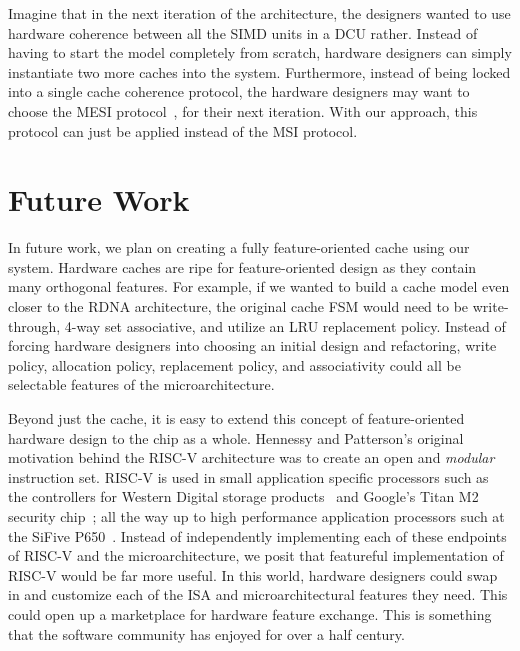 \documentclass[sigplan,anonymous, review]{acmart}
\begin{document}
Imagine that in the next iteration of the architecture, the designers wanted to use hardware coherence between all the SIMD units in a DCU rather. Instead of having to start the model completely from scratch, hardware designers can simply instantiate two more caches into the system. Furthermore, instead of being locked into a single cache coherence protocol, the hardware designers may want to choose the MESI protocol~\cite{Papamarcos:84}, for their next iteration. With our approach, this protocol can just be applied instead of the MSI protocol. 

\section{Future Work}
In future work, we plan on creating a fully feature-oriented cache using our system. Hardware caches are ripe for feature-oriented design as they contain many orthogonal features. For example, if we wanted to build a cache model even closer to the RDNA architecture, the original cache FSM would need to be write-through, 4-way set associative, and utilize an LRU replacement policy. Instead of forcing hardware designers into choosing an initial design and refactoring, write policy, allocation policy, replacement policy, and associativity could all be selectable features of the microarchitecture.

Beyond just the cache, it is easy to extend this concept of feature-oriented hardware design to the chip as a whole. Hennessy and Patterson's original motivation behind the RISC-V architecture was to create an open and \textit{modular} instruction set. RISC-V is used in small application specific processors such as the controllers for Western Digital storage products~\cite{} and Google's Titan M2 security chip~\cite{}; all the way up to high performance application processors such at the SiFive P650~\cite{}. Instead of independently implementing each of these endpoints of RISC-V and the microarchitecture, we posit that featureful implementation of RISC-V would be far more useful. In this world, hardware designers could swap in and customize each of the ISA and microarchitectural features they need. This could open up a marketplace for hardware feature exchange. This is something that the software community has enjoyed for over a half century.

\clearpage


\end{document}
